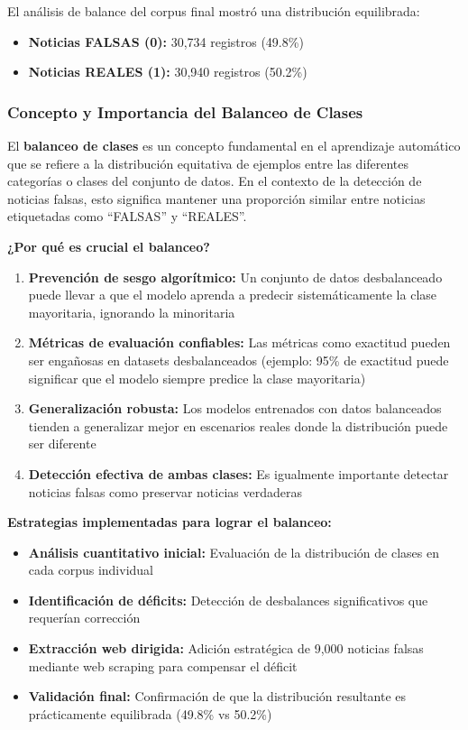 El análisis de balance del corpus final mostró una distribución equilibrada:
\begin{itemize}
    \item \textbf{Noticias FALSAS (0):} 30,734 registros (49.8\%)
    \item \textbf{Noticias REALES (1):} 30,940 registros (50.2\%)
\end{itemize}

\subsubsection{Concepto y Importancia del Balanceo de Clases}

El \textbf{balanceo de clases} es un concepto fundamental en el aprendizaje automático que se refiere a la distribución equitativa de ejemplos entre las diferentes categorías o clases del conjunto de datos. En el contexto de la detección de noticias falsas, esto significa mantener una proporción similar entre noticias etiquetadas como ``FALSAS'' y ``REALES''.

\textbf{¿Por qué es crucial el balanceo?}

\begin{enumerate}
    \item \textbf{Prevención de sesgo algorítmico:} Un conjunto de datos desbalanceado puede llevar a que el modelo aprenda a predecir sistemáticamente la clase mayoritaria, ignorando la minoritaria
    \item \textbf{Métricas de evaluación confiables:} Las métricas como exactitud pueden ser engañosas en datasets desbalanceados (ejemplo: 95\% de exactitud puede significar que el modelo siempre predice la clase mayoritaria)
    \item \textbf{Generalización robusta:} Los modelos entrenados con datos balanceados tienden a generalizar mejor en escenarios reales donde la distribución puede ser diferente
    \item \textbf{Detección efectiva de ambas clases:} Es igualmente importante detectar noticias falsas como preservar noticias verdaderas
\end{enumerate}

\textbf{Estrategias implementadas para lograr el balanceo:}

\begin{itemize}
    \item \textbf{Análisis cuantitativo inicial:} Evaluación de la distribución de clases en cada corpus individual
    \item \textbf{Identificación de déficits:} Detección de desbalances significativos que requerían corrección
    \item \textbf{Extracción web dirigida:} Adición estratégica de 9,000 noticias falsas mediante web scraping para compensar el déficit
    \item \textbf{Validación final:} Confirmación de que la distribución resultante es prácticamente equilibrada (49.8\% vs 50.2\%)
\end{itemize}

